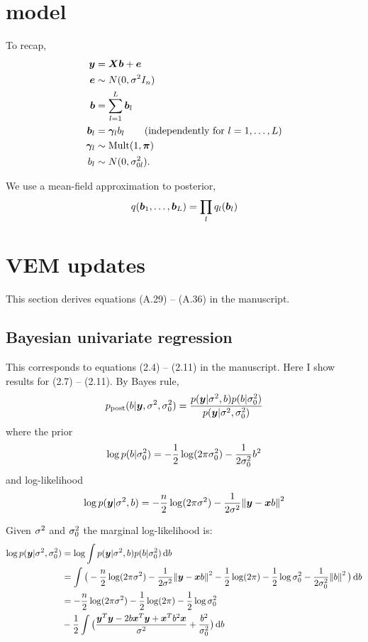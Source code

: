 \section{\susie model}

To recap,
\begin{align}
\bm y &= \bm X\bm b + \bm e \\
\bm e & \sim N(0,\sigma^2 I_n) \\ 
\bm b &= \sum_{l=1}^L \bm b_l\\
\bm b_l & = \bm \gamma_l b_l \qquad (\text{independently for } l=1,\dots,L)\\
\bm \gamma_l & \sim \text{Mult}(1,\bm \pi) \\
b_l & \sim N(0,\sigma^2_{0l}).
\end{align}

We use a mean-field approximation to posterior,
\begin{align}
q(\bm b_1, \ldots, \bm b_L) = \prod_l q_l(\bm b_l)
\end{align}

\section{\susie VEM updates}

This section derives equations (A.29) -- (A.36) in the manuscript. 

\subsection{Bayesian univariate regression} \label{sec:bur}

This corresponds to equations (2.4) -- (2.11) in the manuscript. Here I show results for (2.7) -- (2.11). By Bayes rule,
\begin{equation}
    p_\text{post}(b|\bm y, \sigma^2, \sigma^2_0) = \frac{p(\bm y|\sigma^2,b)p(b|\sigma^2_0)}{p(\bm y|\sigma^2, \sigma^2_0)}
\end{equation}
where the prior
\begin{equation}
    \log p(b|\sigma^2_0) = -\frac{1}{2}\log (2\pi\sigma^2_0) - \frac{1}{2\sigma^2_0}b^2
\end{equation}
and log-likelihood
\begin{equation}
\log p(\bm y|\sigma^2, b) = -\frac{n}{2}\log(2\pi\sigma^2) - \frac{1}{2\sigma^2}\norm{\bm y - \bm x b}^2
\end{equation}

Given $\sigma^2$ and $\sigma^2_0$ the marginal log-likelihood is:
\begin{align}
    \log p(\vy|\rv, \rv_0) &= \log \int p(\vy|\rv, b) p(b|\rv_0)\dif b \label{eqn:bur_marginal}\\
    & = \int \big(-\frac{n}{2} \log(2\pi\rv) - \frac{1}{2\rv}\norm{\vy-\vx b}^2 - \frac{1}{2}\log(2\pi) - \frac{1}{2}\log\rv_0 - \frac{1}{2\rv_0}\norm{b}^2\big)\dif b \\
    & = -\frac{n}{2}\log (2\pi\rv) - \frac{1}{2}\log(2\pi) - \frac{1}{2}\log \rv_0 \\
    & -\frac{1}{2} \int \big( \frac{\vy^T\vy - 2b\vx^T\vy + \vx^T b^2\vx}{\rv} + \frac{b^2}{\rv_0}\big) \dif b \label{eqn:bur_kernel}
\end{align}

